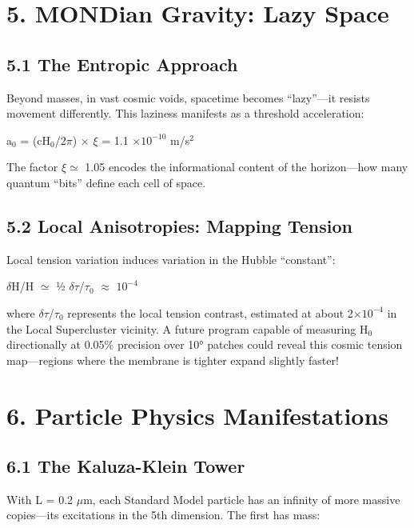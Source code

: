 \documentclass[
  11pt,
]{report}
\begin{document}
\section{5. MONDian Gravity: Lazy
Space}\label{mondian-gravity-lazy-space}

\subsection{5.1 The Entropic Approach}\label{the-entropic-approach}

Beyond masses, in vast cosmic voids, spacetime becomes ``lazy''---it
resists movement differently. This laziness manifests as a threshold
acceleration:

a\(_0\) = (cH\(_0\)/2\(\pi\)) × \(\xi\) = 1.1 \(\times 10^{-10}\)
m/s\(^2\)

The factor \(\xi \simeq\) 1.05 encodes the informational content of the
horizon---how many quantum ``bits'' define each cell of space.

\subsection{5.2 Local Anisotropies: Mapping
Tension}\label{local-anisotropies-mapping-tension}

Local tension variation induces variation in the Hubble ``constant'':

\(\delta\)H/H \(\simeq\) ½ \(\delta\tau\)/\(\tau_0\) \(\approx\)
\(10^{-4}\)

where \(\delta\tau\)/\(\tau_0\) represents the local tension contrast,
estimated at about 2\(\times 10^{-4}\) in the Local Supercluster
vicinity. A future program capable of measuring H\(_0\) directionally at
0.05\% precision over 10° patches could reveal this cosmic tension
map---regions where the membrane is tighter expand slightly faster!

\section{6. Particle Physics
Manifestations}\label{particle-physics-manifestations}

\subsection{6.1 The Kaluza-Klein Tower}\label{the-kaluza-klein-tower}

With L = 0.2 \(\mu\)m, each Standard Model particle has an infinity of
more massive copies---its excitations in the 5th dimension. The first
has mass:
\end{document}
